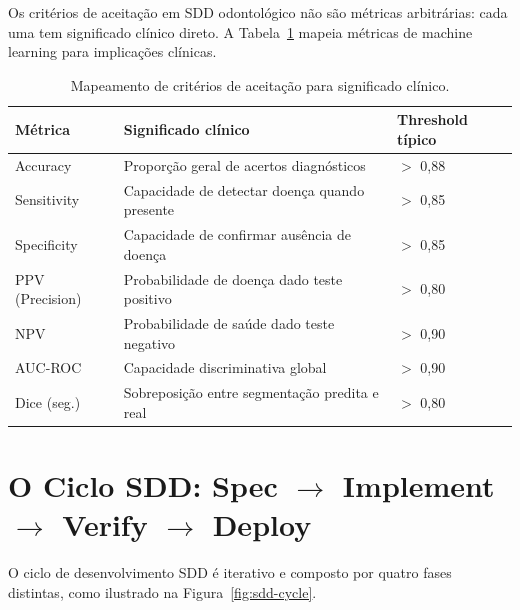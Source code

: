 Os critérios de aceitação em SDD odontológico não são métricas arbitrárias:
cada uma tem significado clínico direto. A Tabela~\ref{tab:criterios-clinicos}
mapeia métricas de machine learning para implicações clínicas.

\begin{table}[H]
  \centering
  \caption{Mapeamento de critérios de aceitação para significado clínico.}
  \label{tab:criterios-clinicos}
  \begin{tabularx}{\textwidth}{lXl}
    \toprule
    \textbf{Métrica} & \textbf{Significado clínico} & \textbf{Threshold típico} \\
    \midrule
    Accuracy & Proporção geral de acertos diagnósticos & $>$ 0,88 \\
    Sensitivity & Capacidade de detectar doença quando presente & $>$ 0,85 \\
    Specificity & Capacidade de confirmar ausência de doença & $>$ 0,85 \\
    PPV (Precision) & Probabilidade de doença dado teste positivo & $>$ 0,80 \\
    NPV & Probabilidade de saúde dado teste negativo & $>$ 0,90 \\
    AUC-ROC & Capacidade discriminativa global & $>$ 0,90 \\
    Dice (seg.) & Sobreposição entre segmentação predita e real & $>$ 0,80 \\
    \bottomrule
  \end{tabularx}
\end{table}


\section{O Ciclo SDD: Spec $\rightarrow$ Implement $\rightarrow$ Verify $\rightarrow$ Deploy}

O ciclo de desenvolvimento SDD é iterativo e composto por quatro fases
distintas, como ilustrado na Figura~\ref{fig:sdd-cycle}.

